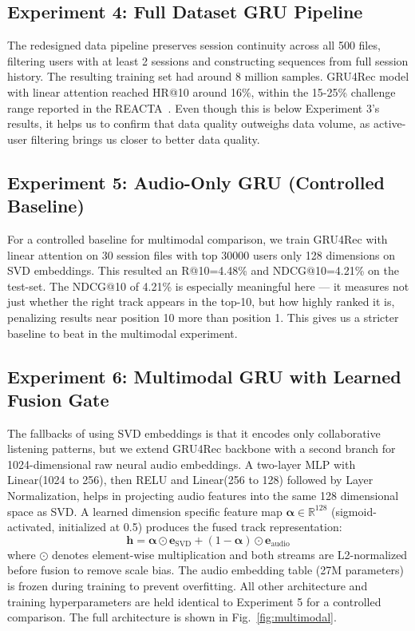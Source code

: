 \documentclass[conference]{IEEEtran}
\begin{document}
\subsection{Experiment 4: Full Dataset GRU Pipeline}
The redesigned data pipeline preserves session continuity across all 500 files,
filtering users with at least 2 sessions and constructing sequences from full
session history. The resulting training set had around 8 million samples.
GRU4Rec model with linear attention reached HR@10 around 16\%, within the
15-25\% challenge range reported in the REACTA~\cite{tran2025reacta}. Even
though this is below Experiment 3's results, it helps us to confirm that data
quality outweighs data volume, as active-user filtering brings us closer to
better data quality.

\subsection{Experiment 5: Audio-Only GRU (Controlled Baseline)}
For a controlled baseline for multimodal comparison, we train GRU4Rec with
linear attention on 30 session files with top 30000 users only 128 dimensions
on SVD embeddings. This resulted an R@10=4.48\% and NDCG@10=4.21\% on the
test-set. The NDCG@10 of 4.21\% is especially meaningful here --- it measures
not just whether the right track appears in the top-10, but how highly ranked
it is, penalizing results near position 10 more than position 1. This gives us
a stricter baseline to beat in the multimodal experiment.

\subsection{Experiment 6: Multimodal GRU with Learned Fusion Gate}
The fallbacks of using SVD embeddings is that it encodes only collaborative
listening patterns, but we extend GRU4Rec backbone with a second branch for
1024-dimensional raw neural audio embeddings. A two-layer MLP with Linear(1024
to 256), then RELU and Linear(256 to 128) followed by Layer Normalization,
helps in projecting audio features into the same 128 dimensional space as SVD.
A learned dimension specific feature map $\boldsymbol{\alpha} \in
\mathbb{R}^{128}$ (sigmoid-activated, initialized at 0.5) produces the fused
track representation:
\begin{equation}
\mathbf{h} = \boldsymbol{\alpha} \odot \mathbf{e}_{\text{SVD}}
           + (1 - \boldsymbol{\alpha}) \odot \mathbf{e}_{\text{audio}}
\end{equation}
where $\odot$ denotes element-wise multiplication and both streams are
L2-normalized before fusion to remove scale bias. The audio embedding table
(27M parameters) is frozen during training to prevent overfitting. All other
architecture and training hyperparameters are held identical to Experiment 5
for a controlled comparison. The full architecture is shown in
Fig.~\ref{fig:multimodal}.
\end{document}
